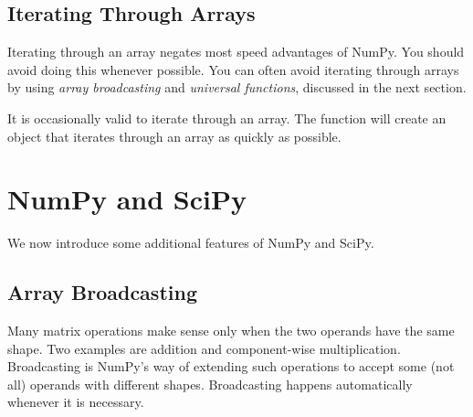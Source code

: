 \subsection*{Iterating Through Arrays}

Iterating through an array negates most speed advantages of NumPy. 
You should avoid doing this whenever possible.
You can often avoid iterating through arrays by using \emph{array broadcasting} and \emph{universal functions}, discussed in the next section.

It is occasionally valid to iterate through an array. 
The function  will create an object that iterates through an array as quickly as possible.


\section*{NumPy and SciPy}
We now introduce some additional features of NumPy and SciPy.

\subsection*{Array Broadcasting}
Many matrix operations make sense only when the two operands have the same shape. 
Two examples are addition and component-wise multiplication. 
Broadcasting is NumPy's way of extending such operations to accept some (not all) operands with different shapes. 
Broadcasting happens automatically whenever it is necessary. 

